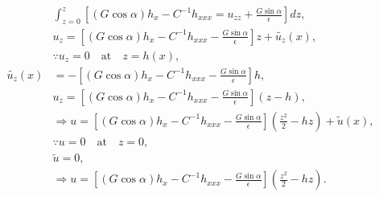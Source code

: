 \documentclass{article}
\begin{document}
\begin{align}\label{eq:pendant_get_u}
 \begin{split}
 & \int_{z=0}^{z} \left[(G\cos{\alpha})h_{x} - C^{-1}h_{xxx} = u_{zz} +  \frac{G\sin{\alpha}}{\epsilon}\right] dz,\\
% 
& u_{z} = \left[(G\cos{\alpha}) h_{x} - C^{-1}h_{xxx} - \frac{G\sin{\alpha}}{\epsilon}\right] z + \tilde{u_{z}}(x),\\ 
& \because u_{z} = 0 \quad \textrm{at} \quad z = h(x), \\
 \tilde{u_{z}}(x) & = -\left[(G\cos{\alpha}) h_{x} - C^{-1}h_{xxx} - \frac{G\sin{\alpha}}{\epsilon}\right]h ,\\
 & \boxed{u_{z} = \left[(G\cos{\alpha}) h_{x} - C^{-1}h_{xxx} - \frac{G\sin{\alpha}}{\epsilon}\right](z-h)},\\
 & \Rightarrow u = \left[(G\cos{\alpha}) h_{x} - C^{-1}h_{xxx} - \frac{G\sin{\alpha}}{\epsilon}\right]\left(\frac{z^{2}}{2} - hz \right) + \tilde{u}(x),\\
 & \because u = 0 \quad \textrm{at} \quad z = 0, \\
 & \tilde{u} = 0,\\
 & \Rightarrow \boxed{u = \left[(G\cos{\alpha}) h_{x} - C^{-1}h_{xxx} - \frac{G\sin{\alpha}}{\epsilon}\right]\left(\frac{z^{2}}{2} - hz \right)}.
 \end{split}
\end{align}
\end{document}
